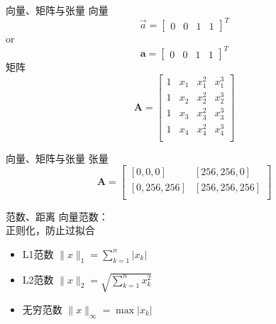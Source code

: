 \documentclass{ctexbeamer}
\begin{document}
\begin{frame}{向量、矩阵与张量}
向量
    \begin{equation*}
        \vec a = \left[
        \begin{array}{cccc}
         0 & 0 & 1 & 1  
    \end{array} \right]^T
    \end{equation*} 
    or
    \begin{equation*}
        \boldsymbol{a} = \left[
        \begin{array}{cccc}
         0 & 0 & 1 & 1  
    \end{array} \right]^T
    \end{equation*} 
矩阵
    \begin{equation*}
        \boldsymbol{A} = \left[
        \begin{array}{cccc}
         1 & x_1 & x_1^2 & x_1^3  \\
         1 & x_2 & x_2^2 & x_2^3  \\
         1 & x_3 & x_3^2 & x_3^3  \\
         1 & x_4 & x_4^2 & x_4^3  \\
    \end{array} \right]
    \end{equation*} 
\end{frame}

\begin{frame}{向量、矩阵与张量}
张量
    \begin{equation*}
        \boldsymbol{A} = \left[
        \begin{array}{cc}
         \left[0,0,0\right] & \left[256,256,0\right]   \\
         \left[0,256,256\right] & \left[256,256,256\right]\\
    \end{array} \right]
    \end{equation*} 
\end{frame}

\begin{frame}{范数、距离}
向量范数：\\
正则化，防止过拟合
    \begin{itemize}
        \item L1范数 $\|x\|_1=\sum_{k=1}^n|x_k|$
        \item L2范数 $\|x\|_2=\sqrt{\sum_{k=1}^nx_k^2}$
        \item 无穷范数 $\|x\|_\infty=\max{|x_k|}$
    \end{itemize}
\end{frame}
\end{document}
